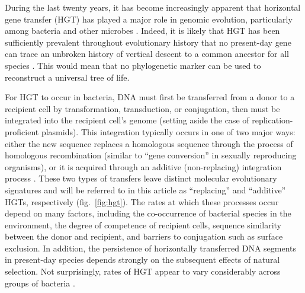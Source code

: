 \documentclass[12pt]{article}
\begin{document}
During the last twenty years, it has become increasingly apparent that
horizontal gene transfer (HGT) has played a major role in genomic
evolution, particularly among bacteria and other microbes
\citep{Smith1992,Smith1993,Ochman2000,Koonin2001}.  Indeed, it is likely
that HGT has been sufficiently prevalent throughout evolutionary history
that no present-day gene can trace an unbroken history of vertical descent
to a common ancestor for all species \citep{Zhaxybayeva2011}.  This would
mean that no phylogenetic marker can be used to reconstruct a
universal tree of life.

For HGT to occur in bacteria, DNA must first be transferred from a donor to
a recipient cell by transformation, transduction, or conjugation, then must
be integrated into the recipient cell's genome (setting aside the case of
replication-proficient plasmids).  This integration typically occurs in one
of two major ways: either the new sequence replaces a homologous sequence
through the process of homologous recombination (similar to ``gene
conversion'' in sexually reproducing organisms), or it is acquired through
an additive (non-replacing) integration process \citep{Thomas2005}.  These
two types of transfers leave distinct molecular evolutionary signatures and
will be referred to in this article as ``replacing'' and ``additive'' HGTs,
respectively (fig.\ \ref{fig:hgt}).  The rates at which these processes
occur depend on many factors, including the co-occurrence of bacterial
species in the environment,
the degree of competence of recipient cells, sequence similarity between
the donor and recipient, and barriers to conjugation such as surface
exclusion.  In addition, the persistence of horizontally transferred DNA
segments in present-day species depends strongly on the subsequent effects
of natural selection.  Not surprisingly, rates of HGT appear to vary
considerably across groups of bacteria \citep[e.g.,][]{Feil2001}.
\end{document}

